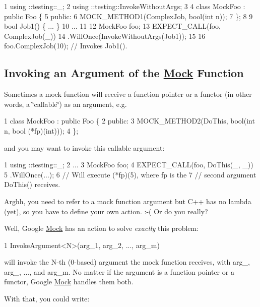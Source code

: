 \begin{DoxyCode}
1 using ::testing::\_;
2 using ::testing::InvokeWithoutArgs;
3 
4 class MockFoo : public Foo \{
5  public:
6   MOCK\_METHOD1(ComplexJob, bool(int n));
7 \};
8 
9 bool Job1() \{ ... \}
10 ...
11 
12   MockFoo foo;
13   EXPECT\_CALL(foo, ComplexJob(\_))
14       .WillOnce(InvokeWithoutArgs(Job1));
15 
16   foo.ComplexJob(10);  // Invokes Job1().
\end{DoxyCode}


\subsection*{Invoking an Argument of the \hyperlink{class_mock}{Mock} Function}

Sometimes a mock function will receive a function pointer or a functor (in other words, a \char`\"{}callable\char`\"{}) as an argument, e.\+g.


\begin{DoxyCode}
1 class MockFoo : public Foo \{
2  public:
3   MOCK\_METHOD2(DoThis, bool(int n, bool (*fp)(int)));
4 \};
\end{DoxyCode}


and you may want to invoke this callable argument\+:


\begin{DoxyCode}
1 using ::testing::\_;
2 ...
3   MockFoo foo;
4   EXPECT\_CALL(foo, DoThis(\_, \_))
5       .WillOnce(...);
6   // Will execute (*fp)(5), where fp is the
7   // second argument DoThis() receives.
\end{DoxyCode}


Arghh, you need to refer to a mock function argument but C++ has no lambda (yet), so you have to define your own action. \+:-\/( Or do you really?

Well, Google \hyperlink{class_mock}{Mock} has an action to solve {\itshape exactly} this problem\+:


\begin{DoxyCode}
1 InvokeArgument<N>(arg\_1, arg\_2, ..., arg\_m)
\end{DoxyCode}


will invoke the {\ttfamily N}-\/th (0-\/based) argument the mock function receives, with {\ttfamily arg\+\_}, {\ttfamily arg\+\_}, ..., and {\ttfamily arg\+\_\+m}. No matter if the argument is a function pointer or a functor, Google \hyperlink{class_mock}{Mock} handles them both.

With that, you could write\+:


